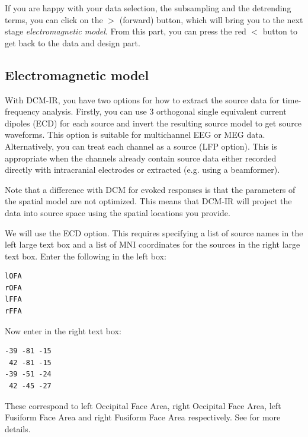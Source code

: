 If you are happy with your data selection, the subsampling and the detrending terms, you can click on the $>$ (forward) button, which will bring you to the next stage \textit{electromagnetic model}. From this part, you can press the red $<$ button to get back to the data and design part.

\subsection{Electromagnetic model}
With DCM-IR, you have two options for how to extract the source data for time-frequency analysis. Firstly, you can use 3 orthogonal single equivalent current dipoles (ECD) for each source and invert the resulting source model to get source waveforms. This option is suitable for multichannel EEG or MEG data. Alternatively, you can treat each channel as a source (LFP option). This is appropriate when the channels already contain source data either recorded directly with intracranial electrodes or extracted (e.g. using a beamformer). 

Note that a difference with DCM for evoked responses is that the parameters of the spatial model are not optimized. This means that DCM-IR will project the data into source space using the spatial locations you provide.

We will use the ECD option. This requires specifying a list of source names in the left large text box and a list of MNI coordinates for the sources in the right large text box. Enter the following in the left box:

\begin{verbatim}
lOFA
rOFA
lFFA
rFFA
\end{verbatim}

Now enter in the right text box:

\begin{verbatim}
-39 -81 -15
 42 -81 -15
-39 -51 -24
 42 -45 -27
\end{verbatim}

These correspond to left Occipital Face Area, right Occipital Face Area, left Fusiform Face Area and right Fusiform Face Area respectively. See \cite{cc_induced} for more details.


